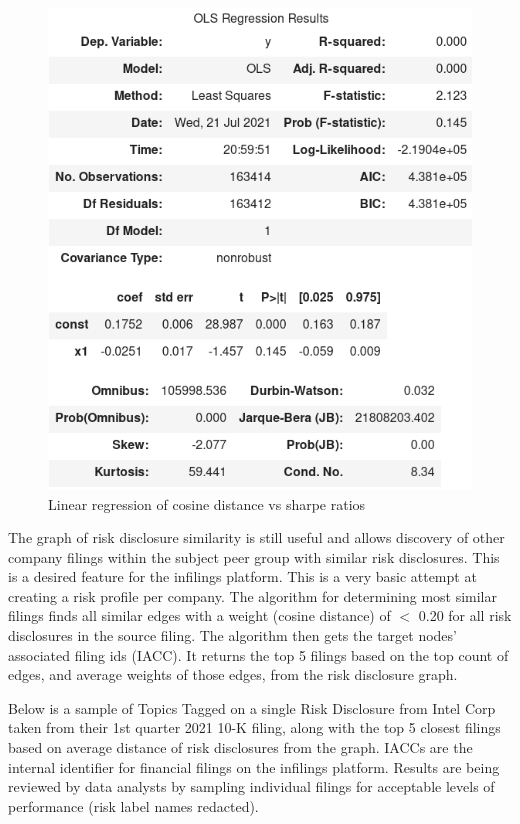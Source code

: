 \documentclass[11pt]{article}
\begin{document}
\begin{figure}[htp]
\centering
\includegraphics[scale=0.40]{images/ols.png}
\caption{Linear regression of cosine distance vs sharpe ratios}
\label{ols}
\end{figure}

\vspace{5 mm}

The graph of risk disclosure similarity is still useful and allows discovery of other company filings within the subject peer group with similar risk disclosures.  This is a desired feature for the infilings platform. This is a very basic attempt at creating a risk profile per company.  The algorithm for determining most similar filings finds all similar edges with a weight (cosine distance) of $<$ 0.20 for all risk disclosures in the source filing.  The algorithm then gets the target nodes' associated filing ids (IACC).  It returns the top 5 filings based on the top count of edges, and average weights of those edges, from the risk disclosure graph.

\vspace{5 mm}

Below is a sample of Topics Tagged on a single Risk Disclosure from Intel Corp taken from their 1st quarter 2021 10-K filing, along with the top 5 closest filings based on average distance of risk disclosures from the graph. IACCs are the internal identifier for financial filings on the infilings platform.  Results are being reviewed by data analysts by sampling individual filings for acceptable levels of performance (risk label names redacted).
\end{document}
